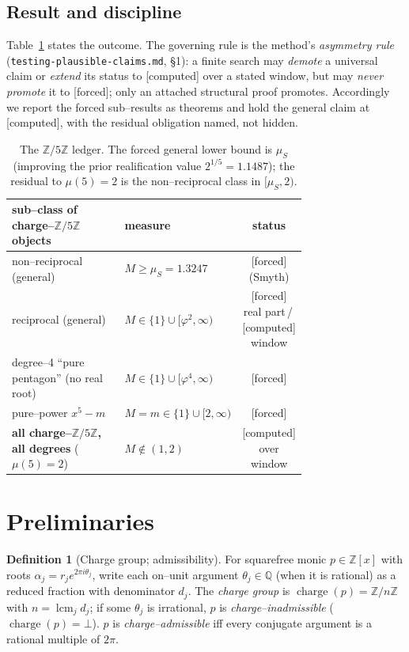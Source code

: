 \documentclass[11pt]{article}
\newcommand{\forced}{\textcolor{cforced}{\textsf{[forced]}}}
\newcommand{\computed}{\textcolor{ccomp}{\textsf{[computed]}}}
\newcommand{\Z}{\mathbb{Z}}
\newcommand{\Q}{\mathbb{Q}}
\newcommand{\Mah}{M}
\newcommand{\muS}{\mu_S}
\newcommand{\Zfive}{\Z/5\Z}
\DeclareMathOperator{\charge}{charge}
\theoremstyle{plain}
\theoremstyle{definition}
\newtheorem{definition}[theorem]{Definition}
\theoremstyle{remark}
\begin{document}
\subsection{Result and discipline}
Table~\ref{tab:summary} states the outcome. The governing rule is the method's \emph{asymmetry rule}
(\texttt{testing-plausible-claims.md}, \S1): a finite search may \emph{demote} a universal claim or
\emph{extend} its status to \computed{} over a stated window, but may \emph{never promote} it to
\forced{}; only an attached structural proof promotes. Accordingly we report the forced sub--results
as theorems and hold the general claim at \computed{}, with the residual obligation named, not hidden.

\begin{table}[ht]
\centering
\small
\begin{tabular}{p{0.46\linewidth}p{0.28\linewidth}c}
\toprule
sub--class of charge--$\Zfive$ objects & measure & status\\
\midrule
non--reciprocal (general) & $\Mah\ge\muS=1.3247$ & \forced{} (Smyth)\\
reciprocal (general) & $\Mah\in\{1\}\cup[\varphi^2,\infty)$ & \forced{} real part\,/\,\computed{} window\\
degree--4 ``pure pentagon'' (no real root) & $\Mah\in\{1\}\cup[\varphi^4,\infty)$ & \forced{}\\
pure--power $x^5-m$ & $\Mah=m\in\{1\}\cup[2,\infty)$ & \forced{}\\
\textbf{all charge--$\Zfive$, all degrees} ($\mu(5)=2$) & $\Mah\notin(1,2)$ & \computed{} over window\\
\bottomrule
\end{tabular}
\caption{The $\Zfive$ ledger. The forced general lower bound is $\muS$ (improving the prior
realification value $2^{1/5}=1.1487$); the residual to $\mu(5)=2$ is the non--reciprocal class in
$[\muS,2)$.}
\label{tab:summary}
\end{table}

\section{Preliminaries}\label{sec:prelim}

\begin{definition}[Charge group; admissibility]\label{def:charge}
For squarefree monic $p\in\Z[x]$ with roots $\alpha_j=r_je^{2\pi i\theta_j}$, write each on--unit
argument $\theta_j\in\Q$ (when it is rational) as a reduced fraction with denominator $d_j$. The
\emph{charge group} is $\charge(p)=\Z/n\Z$ with $n=\operatorname{lcm}_j d_j$; if some $\theta_j$ is
irrational, $p$ is \emph{charge--inadmissible} ($\charge(p)=\bot$). $p$ is \emph{charge--admissible}
iff every conjugate argument is a rational multiple of $2\pi$.
\end{definition}
\end{document}
